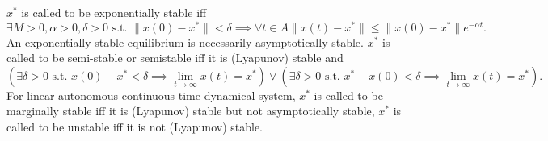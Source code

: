 \documentclass[a4paper,12pt]{report}
\begin{document}
$x^*$ is called to be exponentially stable iff
\[\exists M>0,\alpha>0,\delta>0\text{\ s.t.\ }\|x(0)-x^*\|<\delta\implies\forall t\in A\|x(t)-x^*\|\leq\|x(0)-x^*\|e^{-\alpha t}.\]
An exponentially stable equilibrium is necessarily asymptotically stable.
$x^*$ is called to be semi-stable or semistable iff it is (Lyapunov) stable and
\[(\exists\delta>0\text{\ s.t.\ }x(0)-x^*<\delta\implies\lim_{t\to\infty}x(t)=x^*)\lor (\exists\delta>0\text{\ s.t.\ }x^*-x(0)<\delta\implies\lim_{t\to\infty}x(t)=x^*).\]
For linear autonomous continuous-time dynamical system, $x^*$ is called to be marginally stable iff it is (Lyapunov) stable but not asymptotically stable,
$x^*$ is called to be unstable iff it is not (Lyapunov) stable.
\end{document}
